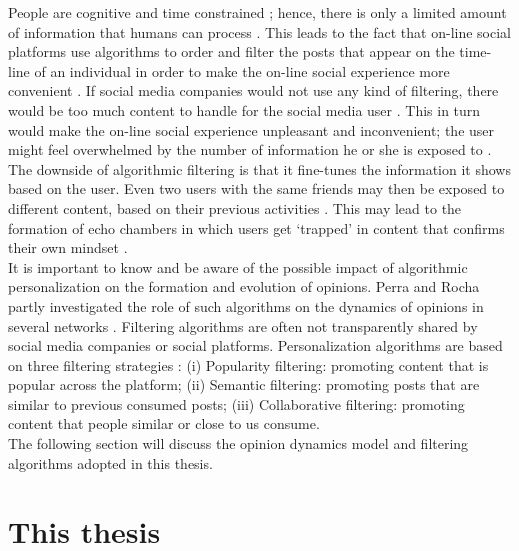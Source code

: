\documentclass[11 pt , letterpaper , twoside , openright]{book}
\begin{document}
People are cognitive and time constrained \cite{Perra2019}; hence, there is only a limited amount of information that humans can process \cite{Bozdag2013}. This leads to the fact that on-line social platforms use algorithms to order and filter the posts that appear on the time-line of an individual in order to make the on-line social experience more convenient \cite{Perra2019}. If social media companies would not use any kind of filtering, there would be too much content to handle for the social media user \cite{Bozdag2013}. This in turn would make the on-line social experience unpleasant and inconvenient; the user might feel overwhelmed by the number of information he or she is exposed to \cite{Bozdag2013}. \\
\newline
The downside of algorithmic filtering is that it fine-tunes the information it shows based on the user. Even two users with the same friends may then be exposed to different content, based on their previous activities \cite{Bozdag2013}. This may lead to the formation of echo chambers in which users get `trapped' in content that confirms their own mindset \cite{Bozdag2013}. \\
\newline
It is important to know and be aware of the possible impact of algorithmic personalization on the formation and evolution of opinions. Perra and Rocha partly investigated the role of such algorithms on the dynamics of opinions in several networks \cite{Perra2019}. Filtering algorithms are often not transparently shared by social media companies or social platforms. Personalization algorithms are based on three filtering strategies \cite{Perra2019}: (i) Popularity filtering: promoting content that is popular across the platform; (ii) Semantic filtering: promoting posts that are similar to previous consumed posts; (iii) Collaborative filtering: promoting content that people similar or close to us consume.\\ 
\newline
The following section will discuss the opinion dynamics model and filtering algorithms adopted in this thesis.

\section{This thesis}\label{modelThesis}
\end{document}
